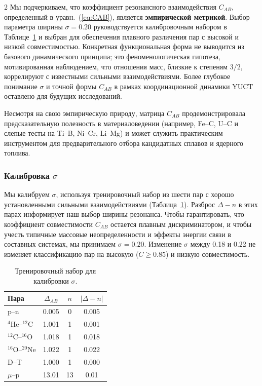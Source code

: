 \documentclass[11pt,a4paper]{article}
\begin{document}
\begin{multicols}{2}
		Мы подчеркиваем, что коэффициент резонансного взаимодействия \(C_{AB}\), определенный в уравн.~(\ref{eq:CAB}), является \textbf{эмпирической метрикой}. Выбор параметра ширины \(\sigma = 0.20\) руководствуется калибровочным набором в Таблице~\ref{tab:calibration} и выбран для обеспечения плавного различения пар с высокой и низкой совместимостью. Конкретная функциональная форма не выводится из базового динамического принципа; это феноменологическая гипотеза, мотивированная наблюдением, что отношения масс, близкие к степеням \(3/2\), коррелируют с известными сильными взаимодействиями. Более глубокое понимание \(\sigma\) и точной формы \(C_{AB}\) в рамках координационной динамики YUCT оставлено для будущих исследований.
		
		Несмотря на свою эмпирическую природу, матрица \(C_{AB}\) продемонстрировала предсказательную полезность в материаловедении (например, Fe–C, U–C и слепые тесты на Ti–B, Ni–Cr, Li–Mg) и может служить практическим инструментом для предварительного отбора кандидатных сплавов и ядерного топлива.
		
		\subsubsection{Калибровка \(\sigma\)}
		
		Мы калибруем \(\sigma\), используя тренировочный набор из шести пар с хорошо установленными сильными взаимодействиями (Таблица~\ref{tab:calibration}). Разброс \(\Delta - n\) в этих парах информирует наш выбор ширины резонанса. Чтобы гарантировать, что коэффициент совместимости \(C_{AB}\) остается плавным дискриминатором, и чтобы учесть типичные массовые неопределенности и эффекты энергии связи в составных системах, мы принимаем \(\sigma = 0.20\). Изменение \(\sigma\) между 0.18 и 0.22 не изменяет классификацию пар на высокую (\(C \ge 0.85\)) и низкую совместимость.
		
		\begin{table}[H]
			\centering
			\caption{Тренировочный набор для калибровки \(\sigma\).}
			\label{tab:calibration}
			\small
			\begin{tabular}{l c c c}
				\toprule
				Пара & \(\Delta_{AB}\) & \(n\) & \(|\Delta - n|\) \\
				\midrule
				p--n    & 0.005 & 0 & 0.005 \\
				\(^4\)He--\(^{12}\)C & 1.001 & 1 & 0.001 \\
				\(^{12}\)C--\(^{16}\)O & 1.018 & 1 & 0.018 \\
				\(^{16}\)O--\(^{20}\)Ne & 1.022 & 1 & 0.022 \\
				D--T    & 1.000 & 1 & 0.000 \\
				\(\mu\)--p & 13.01 & 13 & 0.01 \\
				\bottomrule
			\end{tabular}
		\end{table}
		
	\end{multicols}
	
\end{document}
